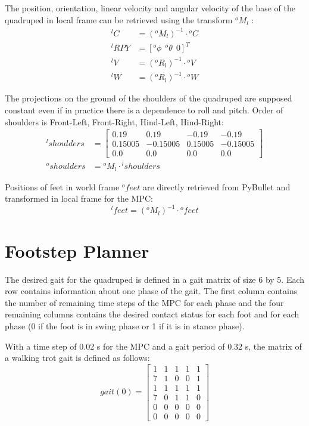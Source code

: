\documentclass[a4paper,11pt]{article}
\newcommand{\fM}[2]{{}^{#1}\!M_{#2}}
\begin{document}
The position, orientation, linear velocity and angular velocity of the base of the quadruped in local frame can be retrieved using the transform $\fM{o}{l}$ :
\begin{align}
{}^l\!C &= (\fM{o}{l})^{-1} \cdot {}^o\!C \\
{}^l\!RPY &= [{}^o\phi~~{}^o\theta~~0]^T \\
{}^l\!V &= ({}^o\!R_l)^{-1} \cdot {}^o\!V \\
{}^l\!W &= ({}^o\!R_l)^{-1} \cdot {}^o\!W
\end{align}

The projections on the ground of the shoulders of the quadruped are supposed constant even if in practice there is a dependence to roll and pitch. Order of shoulders is Front-Left, Front-Right, Hind-Left, Hind-Right:
\begin{align}
{}^l\!shoulders &= \begin{bmatrix} 0.19 & 0.19 & -0.19 & -0.19 \\ 0.15005 & -0.15005 & 0.15005 & -0.15005 \\ 0.0 & 0.0 & 0.0 & 0.0 \end{bmatrix} \\
{}^o\!shoulders &= \fM{o}{l} \cdot {}^l\!shoulders
\end{align}  

Positions of feet in world frame ${}^o\!feet$ are directly retrieved from PyBullet and transformed in local frame for the MPC:
\begin{equation}
{}^l\!feet = (\fM{o}{l})^{-1} \cdot {}^o\!feet
\end{equation} 

\newpage
\section{Footstep Planner}

The desired gait for the quadruped is defined in a gait matrix of size 6 by 5. Each row contains information about one phase of the gait. The first column contains the number of remaining time steps of the MPC for each phase and the four remaining columns contains the desired contact status for each foot and for each phase (0 if the foot is in swing phase or 1 if it is in stance phase).

With a time step of 0.02 s for the MPC and a gait period of 0.32 s, the matrix of a walking trot gait is defined as follows:
\begin{equation}
gait(0) = \begin{bmatrix} 
1 & 1 & 1 & 1 & 1 \\
7 & 1 & 0 & 0 & 1 \\
1 & 1 & 1 & 1 & 1 \\
7 & 0 & 1 & 1 & 0 \\
0 & 0 & 0 & 0 & 0 \\
0 & 0 & 0 & 0 & 0 \end{bmatrix} \label{eq:gait0}
\end{equation}
\end{document}
